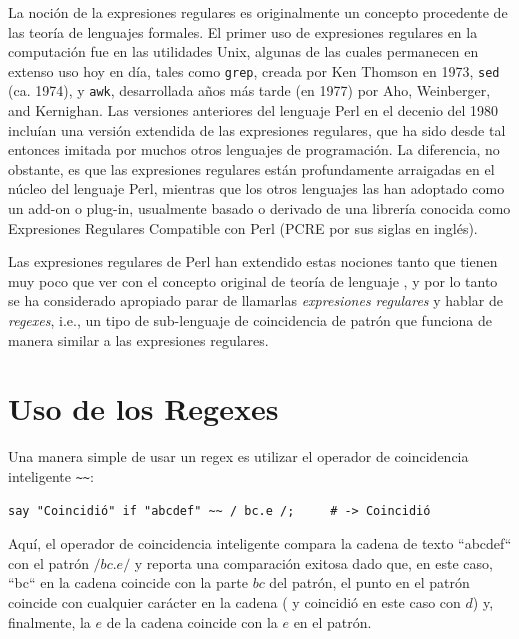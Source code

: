 La noción de la expresiones regulares es originalmente un 
concepto procedente de las teoría de lenguajes formales. 
El primer uso de expresiones regulares en la computación fue 
en las utilidades Unix, algunas de las cuales permanecen en 
extenso uso hoy en día, tales como {\tt grep}, creada por Ken Thomson en 1973,
{\tt sed} (ca. 1974), y {\tt awk}, desarrollada años más tarde (en 1977)
por  Aho, Weinberger, and Kernighan. 
Las versiones anteriores del lenguaje Perl en el decenio del 1980
incluían una versión extendida de las expresiones regulares, que 
ha sido desde tal entonces imitada por muchos otros lenguajes de
programación. La diferencia, no obstante, es que las expresiones
regulares están profundamente arraigadas en el núcleo del lenguaje
Perl, mientras que los otros lenguajes las han adoptado como un
add-on o plug-in, usualmente basado o derivado de una librería 
conocida como Expresiones Regulares Compatible con Perl (PCRE 
por sus siglas en inglés).

Las expresiones regulares de Perl han extendido estas nociones
tanto que tienen muy poco que ver con el concepto original de 
teoría de lenguaje , y por lo tanto se ha considerado 
apropiado parar de llamarlas \emph{expresiones regulares}
y hablar de \emph{regexes}, i.e., un tipo de sub-lenguaje
de coincidencia de patrón que funciona de manera similar
a las expresiones regulares.

\section{Uso de los Regexes}
\label{using_regexes}

Una manera simple de usar un regex es utilizar el operador
de coincidencia inteligente \verb|~~|:

\begin{lstlisting}
say "Coincidió" if "abcdef" ~~ / bc.e /;     # -> Coincidió
\end{lstlisting}
%

Aquí, el operador de coincidencia inteligente compara la 
cadena de texto ``abcdef`` con el patrón $/bc.e/$ y reporta
una comparación exitosa dado que, en este caso, ``bc`` en la
cadena coincide con la parte $bc$ del patrón, el punto en el
patrón coincide con cualquier carácter en la cadena (
y coincidió en este caso con $d$) y, finalmente, la $e$ de la
cadena coincide con la $e$ en el patrón.


